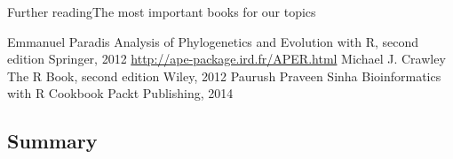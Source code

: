 \documentclass[compress, ucs, xelatex, 11pt, xcolor=svgnames,
  hyperref={
    bookmarks=true,
    unicode=true,
    colorlinks=true,
    pdftitle={Molecular data in R},
    plainpages=false,
    pdfauthor={Vojtech Zeisek},
    pdfsubject={Course about phylogeny and evolution in R},
    pdfcreator={XeLaTeX},
    pdfkeywords={R, evolution, phylogeny, molecular data},
    linkcolor=Tomato,
    anchorcolor=SaddleBrown,
    citecolor=Goldenrod,
    filecolor=DarkMagenta,
    menucolor=Sienna,
    urlcolor=DarkTurquoise,
    pdftex},
  url={hyphens, lowtilde} %
  ]{beamer}
\begin{document}
\begin{frame}{Further reading}{The most important books for our topics}
  \begin{thebibliography}{1}
      Emmanuel Paradis
      \newblock Analysis of Phylogenetics and Evolution with R, second edition
      \newblock Springer, 2012
      \newblock \url{http://ape-package.ird.fr/APER.html}
      Michael J. Crawley
      \newblock The R Book, second edition
      \newblock Wiley, 2012
      Paurush Praveen Sinha
      \newblock Bioinformatics with R Cookbook
      \newblock Packt Publishing, 2014
  \end{thebibliography}
\end{frame}

\subsection{Summary}
\end{document}
